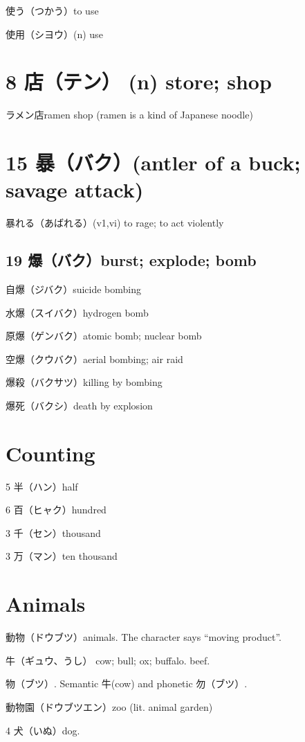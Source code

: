 使う（つかう）to use

使用（シヨウ）(n) use

\section{8 店（テン） (n) store; shop}

ラメン店ramen shop (ramen is a kind of Japanese noodle)

\section{15 暴（バク）(antler of a buck; savage attack)}

暴れる（あばれる）(v1,vi) to rage; to act violently

\subsection{19 爆（バク）burst; explode; bomb}

自爆（ジバク）suicide bombing

水爆（スイバク）hydrogen bomb

原爆（ゲンバク）atomic bomb; nuclear bomb

空爆（クウバク）aerial bombing; air raid

爆殺（バクサツ）killing by bombing

爆死（バクシ）death by explosion

\section{Counting}

5 半（ハン）half

6 百（ヒャク）hundred

3 千（セン）thousand

3 万（マン）ten thousand

\section{Animals}

動物（ドウブツ）animals.
The character says ``moving product''.

牛（ギュウ、うし）
cow; bull; ox; buffalo.
beef.

物（ブツ）.
Semantic 牛(cow) and phonetic 勿（ブツ）.

動物園（ドウブツエン）zoo (lit. animal garden)

4 犬（いぬ）dog.

